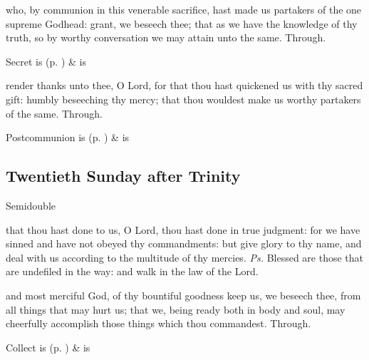 
\secret
{} who, by communion in this venerable sacrifice, hast made us partakers of the one supreme Godhead: grant, we beseech thee; that as we have the knowledge of thy truth, so by worthy conversation we may attain unto the same. Through.
\begin{rubric}
     Secret is  (p. \pageref{SPSaints}) \&  is 
\end{rubric}


\postcommunion
{} render thanks unto thee, O Lord, for that thou hast quickened us with thy sacred gift: humbly beseeching thy mercy; that thou wouldest make us worthy partakers of the same. Through.
\begin{rubric}
     Postcommunion is  (p. \pageref{SPSaints}) \&  is 
\end{rubric}


\clearpage
\subsection{Twentieth Sunday after Trinity}
\begin{inhead}
{Semidouble}
\end{inhead}


\introit
{} that thou hast done to us, O Lord, thou hast done in true judgment: for we have sinned and have not obeyed thy commandments: but give glory to thy name, and deal with us according to the multitude of thy mercies. \textit{Ps.} Blessed are those that are undefiled in the way: and walk in the law of the Lord.

\collect
{} and most merciful God, of thy bountiful goodness keep us, we beseech thee, from all things that may hurt us; that we, being ready both in body and soul, may cheerfully accomplish those things which thou commandest. Through.
\begin{rubric}
     Collect is  (p. \pageref{SPSaints}) \&  is 
\end{rubric}

